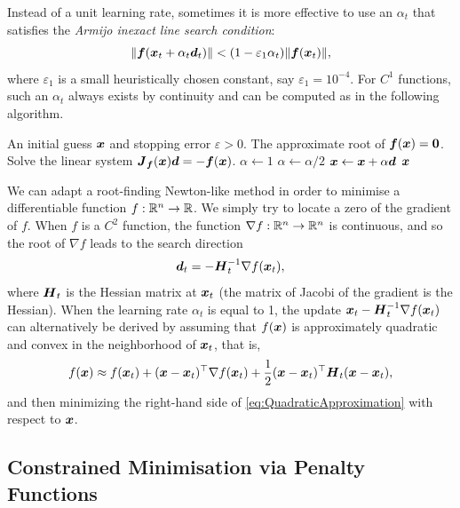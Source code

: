 Instead of a unit learning rate, sometimes it is more effective to use an \(\alpha_t\) that satisfies the \textit{Armijo inexact line search condition}:
\begin{equation*}
	\|\boldsymbol{f}(\boldsymbol{x}_t + \alpha_t \boldsymbol{d}_t)\| < (1 - \varepsilon_1 \alpha_t) \|\boldsymbol{f}(\boldsymbol{x}_t)\|,
\end{equation*}
where \(\varepsilon_1\) is a small heuristically chosen constant, say \(\varepsilon_1 = 10^{-4}\). For \(C^1\) functions, such an \(\alpha_t\) always exists by continuity and can be computed as in the following algorithm.

\begin{algorithm}[H]
	\caption{Newton--Raphson for Finding Roots of \(\vecb{f}(\vecb{x}) = \vecb{0}\)}
	\label{alg:NewtonRaphson}
	\begin{algorithmic}[1]
		\Require An initial guess \(\boldsymbol{x}\) and stopping error \(\varepsilon > 0\).
		\Ensure The approximate root of \(\vecb{f}(\vecb{x}) = \vecb{0}\).
		\State Solve the linear system \(\boldsymbol{J}_{\boldsymbol{f}}(\boldsymbol{x}) \boldsymbol{d} = -\boldsymbol{f}(\boldsymbol{x})\).
		\State \(\alpha \gets 1\)
		\State \(\alpha \gets \alpha/2\)
		\EndWhile
		\State \(\boldsymbol{x} \gets \boldsymbol{x} + \alpha \boldsymbol{d}\)
		\EndWhile
		\State \Return \(\boldsymbol{x}\)
	\end{algorithmic}
\end{algorithm}

We can adapt a root-finding Newton-like method in order to minimise a differentiable function \(f : \mathbb{R}^n \to \mathbb{R}\). We simply try to locate a zero of the gradient of \(f\). When \(f\) is a \(C^2\) function, the function \(\nabla f : \mathbb{R}^n \to \mathbb{R}^n\) is continuous, and so the root of \(\nabla f\) leads to the search direction
\begin{equation}
	\boldsymbol{d}_t = -\boldsymbol{H}_t^{-1} \nabla f(\boldsymbol{x}_t), \label{eq:NewtonSearchDirection}
\end{equation}
where \(\boldsymbol{H}_t\) is the Hessian matrix at \(\boldsymbol{x}_t\) (the matrix of Jacobi of the gradient is the Hessian). When the learning rate \(\alpha_t\) is equal to 1, the update \(\boldsymbol{x}_t - \boldsymbol{H}_t^{-1} \nabla f(\boldsymbol{x}_t)\) can alternatively be derived by assuming that \(f(\boldsymbol{x})\) is approximately quadratic and convex in the neighborhood of \(\boldsymbol{x}_t\), that is,
\begin{equation}
	f(\boldsymbol{x}) \approx f(\boldsymbol{x}_t) + (\boldsymbol{x} - \boldsymbol{x}_t)^\top \nabla f(\boldsymbol{x}_t) + \frac{1}{2} (\boldsymbol{x} - \boldsymbol{x}_t)^\top \boldsymbol{H}_t (\boldsymbol{x} - \boldsymbol{x}_t), \label{eq:QuadraticApproximation}
\end{equation}
and then minimizing the right-hand side of \cref{eq:QuadraticApproximation} with respect to \(\boldsymbol{x}\).

\subsection{Constrained Minimisation via Penalty Functions}
